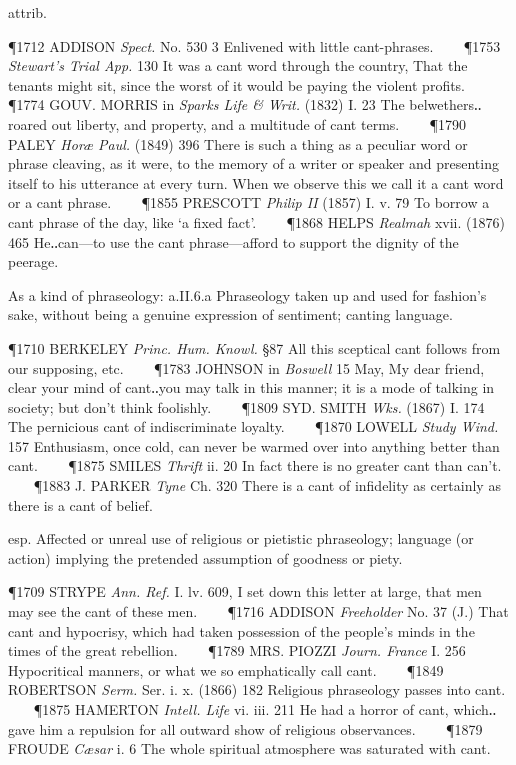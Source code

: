 \begin{description}[wide, labelwidth=!, labelindent=0pt]
\begin{myenumerate}
 attrib.

\P 1712 ADDISON  \textit{Spect.} No. 530 3 Enlivened with little cant-phrases.    
\P 1753 \textit{Stewart's Trial App.} 130 It was a cant word through the country, That the tenants might sit, since the worst of it would be paying the violent profits.    
\P 1774 GOUV. MORRIS in \textit{Sparks Life \& Writ.} (1832) I. 23 The belwethers‥roared out liberty, and property, and a multitude of cant terms.    
\P 1790 PALEY  \textit{Horæ Paul.} (1849) 396 There is such a thing as a peculiar word or phrase cleaving, as it were, to the memory of a writer or speaker and presenting itself to his utterance at every turn. When we observe this we call it a cant word or a cant phrase.    
\P 1855 PRESCOTT  \textit{Philip II} (1857) I. v. 79 To borrow a cant phrase of the day, like ‘a fixed fact’.    
\P 1868 HELPS  \textit{Realmah} xvii. (1876) 465 He‥can—to use the cant phrase—afford to support the dignity of the peerage.

 As a kind of phraseology: a.II.6.a Phraseology taken up and used for fashion's sake, without being a genuine expression of sentiment; canting language.

\P 1710 BERKELEY  \textit{Princ. Hum. Knowl.} §87 All this sceptical cant follows from our supposing, etc.    
\P 1783 JOHNSON in \textit{Boswell} 15 May, My dear friend, clear your mind of cant‥you may talk in this manner; it is a mode of talking in society; but don't think foolishly.    
\P 1809 SYD.  SMITH \textit{Wks.} (1867) I. 174 The pernicious cant of indiscriminate loyalty.    
\P 1870 LOWELL  \textit{Study Wind.} 157 Enthusiasm, once cold, can never be warmed over into anything better than cant.    
\P 1875 SMILES  \textit{Thrift} ii. 20 In fact there is no greater cant than can't.    
\P 1883 J. PARKER  \textit{Tyne} Ch. 320 There is a cant of infidelity as certainly as there is a cant of belief.

 esp. Affected or unreal use of religious or pietistic phraseology; language (or action) implying the pretended assumption of goodness or piety.

\P 1709 STRYPE  \textit{Ann. Ref.} I. lv. 609, I set down this letter at large, that men may see the cant of these men.    
\P 1716 ADDISON  \textit{Freeholder} No. 37 (J.) That cant and hypocrisy, which had taken possession of the people's minds in the times of the great rebellion.    
\P 1789 MRS. PIOZZI  \textit{Journ. France} I. 256 Hypocritical manners, or what we so emphatically call cant.    
\P 1849 ROBERTSON  \textit{Serm.} Ser. i. x. (1866) 182 Religious phraseology passes into cant.    
\P 1875 HAMERTON  \textit{Intell. Life} vi. iii. 211 He had a horror of cant, which‥gave him a repulsion for all outward show of religious observances.    
\P 1879 FROUDE  \textit{Cæsar} i. 6 The whole spiritual atmosphere was saturated with cant.


\end{myenumerate}
\end{description}
